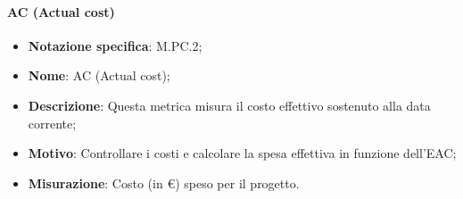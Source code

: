 \paragraph*{AC (Actual cost)}
\begin{itemize}
    \item \textbf{Notazione specifica}: M.PC.2;
    \item \textbf{Nome}: AC (Actual cost);
    \item \textbf{Descrizione}: Questa metrica misura il costo effettivo sostenuto alla data corrente;
    \item \textbf{Motivo}: Controllare i costi e calcolare la spesa effettiva in funzione dell'EAC;
    \item \textbf{Misurazione}: Costo (in €) speso per il progetto.
\end{itemize}
